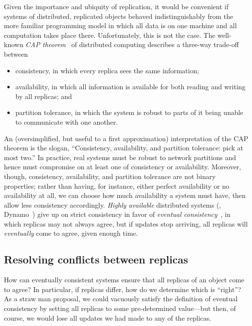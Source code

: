 \documentclass{article}
\begin{document}
Given the importance and ubiquity of replication, it would be
convenient if systems of distributed, replicated objects behaved
indistinguishably from the more familiar programming model in which
all data is on one machine and all computation takes place there.
Unfortunately, this is not the case.  The well-known \emph{CAP
  theorem}~\cite{gilbert-lynch-cap} of distributed computing describes
a three-way trade-off between
\begin{itemize}
\item consistency, in which every replica sees the same information;
\item availability, in which all information is available for both
  reading and writing by all replicas; and
\item partition tolerance, in which the system is robust to parts of
  it being unable to communicate with one another.
\end{itemize}
An (oversimplified, but useful to a first approximation)
interpretation of the CAP theorem is the slogan, ``Consistency,
availability, and partition tolerance: pick at most two.''  In
practice, real systems must be robust to network partitions and hence
must compromise on at least one of consistency or availability.
Moreover, though, consistency, availability, and partition tolerance
are not binary properties; rather than having, for instance, either
perfect availability or no availability at all, we can choose how much
availability a system must have, then allow less consistency
accordingly.  \emph{Highly available} distributed systems (\eg,
Dynamo~\cite{dynamo}) give up on strict consistency in favor of
\emph{eventual consistency}~\cite{vogels-ec}, in which replicas may
not always agree, but if updates stop arriving, all replicas will
\emph{eventually} come to agree, given enough time.

\subsection{Resolving conflicts between replicas}

How can eventually consistent systems ensure that all replicas of an
object come to agree?  In particular, if replicas differ, how do we
determine which is ``right''?  As a straw man proposal, we could
vacuously satisfy the definition of eventual consistency by setting
all replicas to some pre-determined value---but then, of course, we
would lose all updates we had made to any of the replicas.
\end{document}
